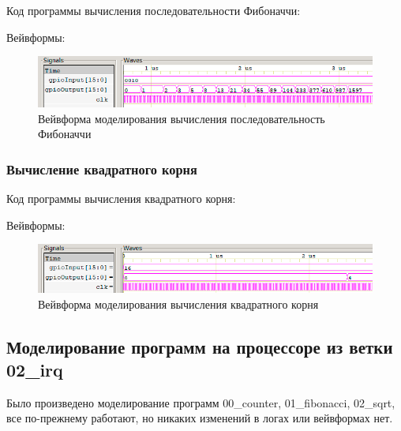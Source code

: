 \documentclass[a4paper,14pt]{article}
\begin{document}
    Код программы вычисления последовательности Фибоначчи:

    {\small {}}

    Вейвформы:

    \begin{figure}[H]
        \centering
        \includegraphics[width=0.7\linewidth]{images/fibo_wvf}
        \caption{Вейвформа моделирования вычисления последовательность Фибоначчи}
        \label{fig:fibowvf}
    \end{figure}

    \subsubsection{Вычисление квадратного корня}

    Код программы вычисления квадратного корня:

    {\small {}}

    Вейвформы:

    \begin{figure}[H]
        \centering
        \includegraphics[width=0.7\linewidth]{images/sqrt_wvf}
        \caption{Вейвформа моделирования вычисления квадратного корня}
        \label{fig:sqrtwvf}
    \end{figure}

	\subsection{Моделирование программ на процессоре из ветки 02\_irq}

	Было произведено моделирование программ  00\_counter, 01\_fibonacci, 02\_sqrt, все по-прежнему работают, но никаких изменений в логах или вейвформах нет.
	
	
	
	
\end{document}
